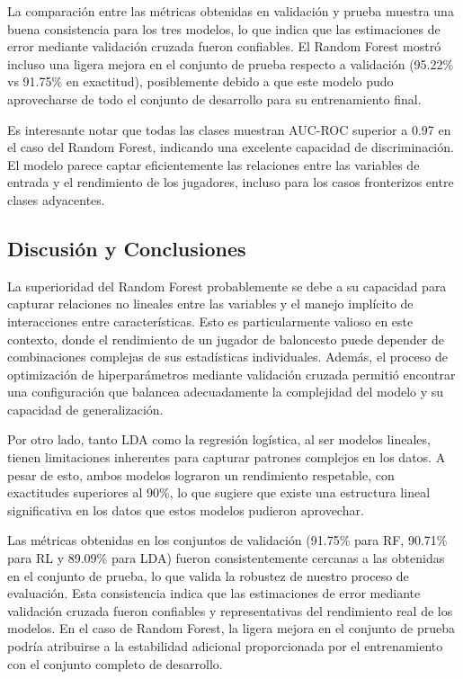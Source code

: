 La comparación entre las métricas obtenidas en validación y prueba muestra una buena consistencia para los tres modelos, lo que indica que las estimaciones de error mediante validación cruzada fueron confiables. El Random Forest mostró incluso una ligera mejora en el conjunto de prueba respecto a validación (95.22\% vs 91.75\% en exactitud), posiblemente debido a que este modelo pudo aprovecharse de todo el conjunto de desarrollo para su entrenamiento final.

Es interesante notar que todas las clases muestran AUC-ROC superior a 0.97 en el caso del Random Forest, indicando una excelente capacidad de discriminación. El modelo parece captar eficientemente las relaciones entre las variables de entrada y el rendimiento de los jugadores, incluso para los casos fronterizos entre clases adyacentes.

\subsection{Discusión y Conclusiones}

La superioridad del Random Forest probablemente se debe a su capacidad para capturar relaciones no lineales entre las variables y el manejo implícito de interacciones entre características. Esto es particularmente valioso en este contexto, donde el rendimiento de un jugador de baloncesto puede depender de combinaciones complejas de sus estadísticas individuales. Además, el proceso de optimización de hiperparámetros mediante validación cruzada permitió encontrar una configuración que balancea adecuadamente la complejidad del modelo y su capacidad de generalización.

Por otro lado, tanto LDA como la regresión logística, al ser modelos lineales, tienen limitaciones inherentes para capturar patrones complejos en los datos. A pesar de esto, ambos modelos lograron un rendimiento respetable, con exactitudes superiores al 90\%, lo que sugiere que existe una estructura lineal significativa en los datos que estos modelos pudieron aprovechar.

Las métricas obtenidas en los conjuntos de validación (91.75\% para RF, 90.71\% para RL y 89.09\% para LDA) fueron consistentemente cercanas a las obtenidas en el conjunto de prueba, lo que valida la robustez de nuestro proceso de evaluación. Esta consistencia indica que las estimaciones de error mediante validación cruzada fueron confiables y representativas del rendimiento real de los modelos. En el caso de Random Forest, la ligera mejora en el conjunto de prueba podría atribuirse a la estabilidad adicional proporcionada por el entrenamiento con el conjunto completo de desarrollo.

